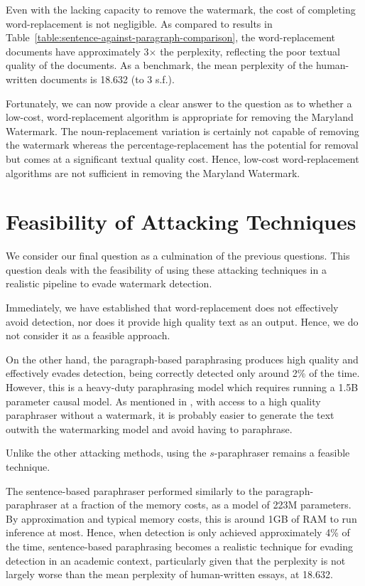 \documentclass{l4proj}
\theoremstyle{definition}
\begin{document}
    Even with the lacking capacity to remove the watermark, the cost of completing word-replacement is not negligible. As compared to results in Table~\ref{table:sentence-against-paragraph-comparison}, the word-replacement documents have approximately 3$\times$ the perplexity, reflecting the poor textual quality of the documents. As a benchmark, the mean perplexity of the human-written documents is 18.632 (to 3 s.f.).

    Fortunately, we can now provide a clear answer to the question as to whether a low-cost, word-replacement algorithm is appropriate for removing the Maryland Watermark. The noun-replacement variation is certainly not capable of removing the watermark whereas the percentage-replacement has the potential for removal but comes at a significant textual quality cost. Hence, low-cost word-replacement algorithms are not sufficient in removing the Maryland Watermark.

\section{Feasibility of Attacking Techniques}
    We consider our final question as a culmination of the previous questions. This question deals with the feasibility of using these attacking techniques in a realistic pipeline to evade watermark detection.

    Immediately, we have established that word-replacement does not effectively avoid detection, nor does it provide high quality text as an output. Hence, we do not consider it as a feasible approach. 

    On the other hand, the paragraph-based paraphrasing produces high quality and effectively evades detection, being correctly detected only around 2\% of the time. However, this is a heavy-duty paraphrasing model which requires running a 1.5B parameter causal model. As mentioned in \citet{kirchenbauer2023watermark}, with access to a high quality paraphraser without a watermark, it is probably easier to generate the text outwith the watermarking model and avoid having to paraphrase.

    Unlike the other attacking methods, using the $s$-paraphraser remains a feasible technique. 

    The sentence-based paraphraser performed similarly to the paragraph-paraphraser at a fraction of the memory costs, as a model of 223M parameters. By approximation and typical memory costs, this is around 1GB of RAM to run inference at most. Hence, when detection is only achieved approximately 4\% of the time, sentence-based paraphrasing becomes a realistic technique for evading detection in an academic context, particularly given that the perplexity is not largely worse than the mean perplexity of human-written essays, at 18.632.
\end{document}
